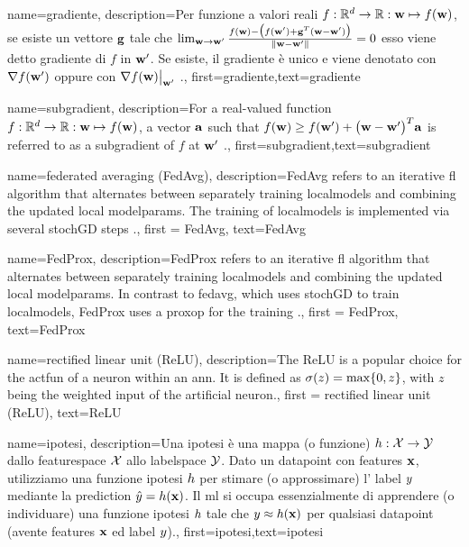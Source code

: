 {name={gradiente},
	description={Per funzione a valori reali $f: \mathbb{R}^{d} \rightarrow \mathbb{R}: {\bf w} \mapsto f({\bf w})$, 
	se esiste un vettore ${\bf g}$ tale che $\lim_{{\bf w} \rightarrow {\bf w}'} \frac{f({\bf w}) - \big(f({\bf w}')+ {\bf g}^{T} ({\bf w}- {\bf w}') \big) }{\| {\bf w}-{\bf w}'\|}=0$ 
	esso viene detto gradiente di $f$ in ${\bf w}'$. Se esiste, il gradiente è unico e viene 
	denotato con $\nabla f({\bf w}')$ oppure con $\nabla f({\bf w})\big|_{{\bf w}'}$ \cite{RudinBookPrinciplesMatheAnalysis}.},
	first={gradiente},text={gradiente} 
}

{name={subgradient},
description={For a real-valued function $f: \mathbb{R}^{d} \rightarrow \mathbb{R}: {\bf w} \mapsto f({\bf w})$, 
		a vector ${\bf a}$ such that $f({\bf w}) \geq  f({\bf w}') +\big({\bf w}-{\bf w}' \big)^{T} {\bf a}$ is 
		referred to as a subgradient of $f$ at ${\bf w}'$ \cite{BertCvxAnalOpt,BertsekasNonLinProgr}.},
	first={subgradient},text={subgradient} 
}

{name={federated averaging (FedAvg)},
	description={FedAvg refers to an iterative \gls{fl} \gls{algorithm} that alternates between separately training \gls{localmodel}s and combining the updated local \gls{modelparams}. The training of \gls{localmodel}s 
		is implemented via several \gls{stochGD} steps \cite{pmlr-v54-mcmahan17a}.}, 
		first = {FedAvg}, text={FedAvg} 
}

{name={FedProx},
	description={FedProx refers to an iterative \gls{fl} \gls{algorithm} that alternates between separately training \gls{localmodel}s and combining the updated local \gls{modelparams}. In contrast to \gls{fedavg}, which uses 
		\gls{stochGD} to train \gls{localmodel}s, FedProx uses a \gls{proxop} for the training \cite{FedProx2020}.}, 
	first = {FedProx}, text={FedProx} 
}

{name={rectified linear unit (ReLU)},
	description={The ReLU is 
		a popular choice for the \gls{actfun} of a neuron within an \gls{ann}. It is defined 
		as $\sigma(z) = \max\{0,z\}$, with $z$ being the weighted input of the artificial 
		neuron.}, first = {rectified linear unit (ReLU)}, text={ReLU} 
}

{name={ipotesi},
	description={Una ipotesi è una mappa (o funzione) $h: \mathcal{X} \rightarrow \mathcal{Y}$ dallo 
		\gls{featurespace} $\mathcal{X}$ allo \gls{labelspace} $\mathcal{Y}$. 
		Dato un \gls{datapoint} con \glspl{feature} ${\bf x}$, utilizziamo una funzione ipotesi $h$
		per stimare (o approssimare) l' \gls{label} $y$ mediante la \gls{prediction}  
		$\hat{y} = h({\bf x})$. Il \gls{ml} si occupa essenzialmente di apprendere (o individuare) 
		una funzione ipotesi $h$ tale che $y \approx h({\bf x})$ 
		per qualsiasi \gls{datapoint} (avente \glspl{feature} ${\bf x}$ ed \gls{label} $y$).},
	first={ipotesi},text={ipotesi}  
}



